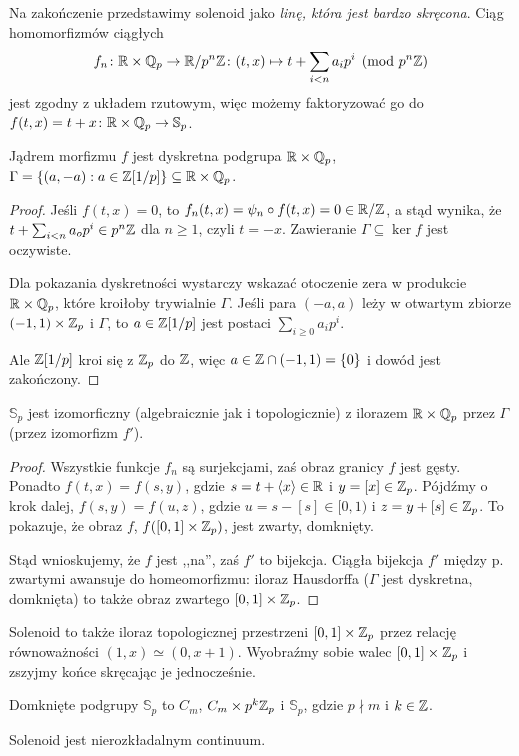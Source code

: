 Na zakończenie przedstawimy solenoid jako \emph{linę, która jest bardzo skręcona}.
Ciąg homomorfizmów ciągłych
\[
	f_n \colon \mathbb R \times \mathbb Q_p \to \mathbb R / p^n \mathbb Z \colon (t, x) \mapsto t + \sum_{i < n} a_i p^i \pmod{p^n\mathbb Z }
\]
jest zgodny z układem rzutowym, więc możemy faktoryzować go do $f (t, x) = t + x \colon \mathbb R \times \mathbb Q_p \to \mathbb S_p$.

\begin{lemat}
	Jądrem  morfizmu $f$ jest dyskretna podgrupa $\mathbb R \times \mathbb Q_p$, $\Gamma = \{(a, -a) : a \in \mathbb Z[1/p]\} \subseteq \mathbb R \times \mathbb Q_p$.
\end{lemat}

\begin{proof}
	Jeśli $f(t, x) = 0$, to $f_n(t, x) = \psi_n \circ f(t, x) = 0 \in \mathbb R/\mathbb Z$, a stąd wynika, że $t + \sum_{i < n} a_o p^i \in p^n\mathbb Z$ dla $n \ge 1$, czyli $t = -x$.
	Zawieranie $\Gamma \subseteq \ker f$ jest oczywiste.

	Dla pokazania dyskretności wystarczy wskazać otoczenie zera w produkcie $\mathbb R \times \mathbb Q_p$, które kroiłoby trywialnie $\Gamma$.
	Jeśli para $(-a, a)$ leży w otwartym zbiorze $(-1, 1) \times \mathbb Z_p$ i $\Gamma$, to $a \in \mathbb Z[1/p]$ jest postaci $\sum_{i \ge 0} a_i p^i$.

	Ale $\mathbb Z[1/p]$ kroi się z $\mathbb Z_p$ do $\mathbb Z$, więc $a \in \mathbb Z \cap (-1, 1) = \{0\}$ i dowód jest zakończony.
\end{proof}

\begin{fakt}
	$\mathbb S_p$ jest izomorficzny (algebraicznie jak i topologicznie) z ilorazem $\mathbb R \times \mathbb Q_p$ przez $\Gamma$ (przez izomorfizm $f'$).
\end{fakt}

\begin{proof}
	Wszystkie funkcje $f_n$ są surjekcjami, zaś obraz granicy $f$ jest gęsty.
	Ponadto $f(t, x) = f(s, y)$, gdzie $s = t + \langle x \rangle \in \mathbb R$ i $y = [x] \in \mathbb Z_p$.
	Pójdźmy o krok dalej, $f(s, y) = f(u, z)$, gdzie $u = s - [s] \in [0, 1)$ i $z = y + [s] \in \mathbb Z_p$.
	To pokazuje, że obraz $f$, $f([0, 1] \times \mathbb Z_p)$, jest zwarty, domknięty.

	Stąd wnioskujemy, że $f$ jest ,,na'', zaś $f'$ to bijekcja.
	Ciągła bijekcja $f'$ między p. zwartymi awansuje do homeomorfizmu: iloraz Hausdorffa ($\Gamma$ jest dyskretna, domknięta) to także obraz zwartego $[0,1] \times \mathbb Z_p$.
\end{proof}

Solenoid to także iloraz topologicznej przestrzeni $[0, 1] \times \mathbb Z_p$ przez relację równoważności $(1, x) \simeq (0, x+1)$.
Wyobraźmy sobie walec $[0,1] \times \mathbb Z_p$ i zszyjmy końce skręcając je jednocześnie.

\begin{fakt}
	Domknięte podgrupy $\mathbb S_p$ to $C_m$, $C_m \times p^k\mathbb Z_p$ i $\mathbb S_p$, gdzie $p \nmid m$ i $k \in \mathbb Z$.
\end{fakt}

\begin{fakt}
	Solenoid jest nierozkładalnym continuum.
\end{fakt}
